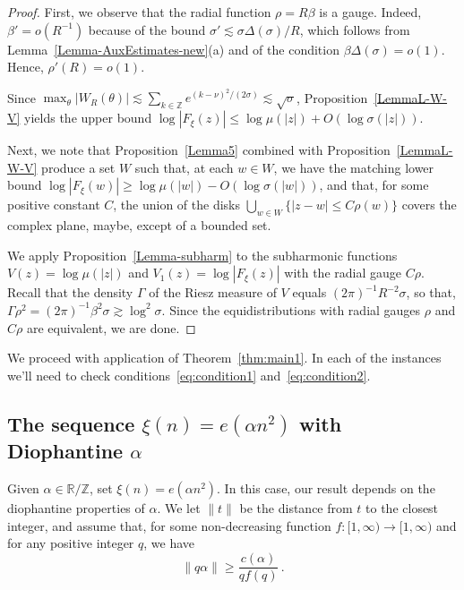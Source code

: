 \documentclass[11pt]{amsart}
\numberwithin{equation}{section}
\newcommand{\bR}{\mathbb R}
\newcommand{\bZ}{\mathbb Z}
\begin{document}
\begin{proof}
First, we observe that the radial function $\rho=R\beta$ is a gauge.
Indeed, $\beta' = o(R^{-1})$ because of the bound $\sigma'\lesssim \sigma\Delta(\sigma)/R$, which follows from
Lemma~\ref{Lemma-AuxEstimates-new}(a) and of the condition $\beta \Delta(\sigma) = o(1)$.
Hence,  $\rho'(R)=o(1)$.

Since $\max_\theta |W_R(\theta)|
\lesssim \sum_{k\in \bZ} e^{(k-\nu)^2/(2\sigma)} \lesssim \sqrt{\sigma} $,
Proposition~\ref{LemmaL-W-V} yields the upper bound
$\log |F_\xi (z)| \le \log \mu (|z|) + O(\log \sigma (|z|))$.

Next, we note that
Proposition~\ref{Lemma5} combined with Proposition~\ref{LemmaL-W-V} produce a set
$W$ such that, at each $w\in W$, we have the matching lower bound
$ \log |F_\xi (w)| \ge \log \mu (|w|) - O(\log\sigma (|w|)) $,
and that, for some positive constant $C$,
the union of the disks $\bigcup_{w\in W} \{|z-w|\le C\rho(w)\}$
covers the complex plane, maybe, except of a bounded set.

We apply Proposition~\ref{Lemma-subharm} to the subharmonic functions
$V(z)=\log\mu (|z|)$ and $V_1(z)=\log|F_\xi(z)|$ with the radial gauge $C\rho$.
Recall that the density $\Gamma$ of the Riesz measure of $V$ equals $(2\pi)^{-1}R^{-2}\sigma$,
so that, $\Gamma \rho^2 = (2\pi)^{-1}\beta^2\sigma\gtrsim \log^2\sigma$. Since
the equidistributions with radial gauges $\rho$ and $C\rho$ are equivalent,
we are done. \end{proof}

We proceed with application of Theorem~\ref{thm:main1}. In each of the
instances we'll need to check conditions~\eqref{eq:condition1} and~\eqref{eq:condition2}.

\subsection{The sequence $\xi(n)=e(\alpha n^2)$ with Diophantine $\alpha$}

Given $\alpha\in\bR / \bZ$, set $\xi(n) = e(\alpha n^2)$. In this case, our result
depends on the diophantine properties of $\alpha$. We let $\| t \|$ be the distance from
$t$ to the closest integer, and assume that, for some non-decreasing
function $f\colon [1, \infty)\to [1, \infty)$ and for any positive integer $q$, we have
\begin{equation}\label{eq:diophantine}
\| q\alpha \| \ge \frac{c(\alpha)}{qf(q)}\,.
\end{equation}
\end{document}
